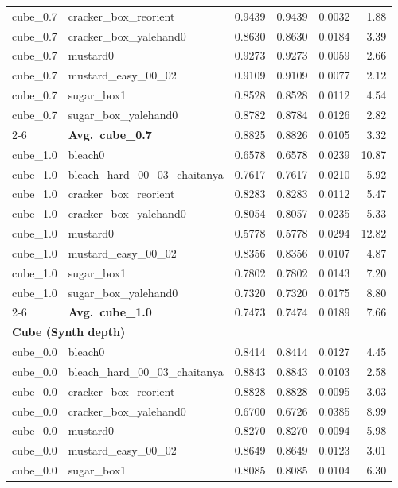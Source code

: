 \begin{longtable}{llrrrr}
  cube_0.7 & cracker\_box\_reorient & 0.9439 & 0.9439 & 0.0032 & 1.88 \\
  cube_0.7 & cracker\_box\_yalehand0 & 0.8630 & 0.8630 & 0.0184 & 3.39 \\
  cube_0.7 & mustard0 & 0.9273 & 0.9273 & 0.0059 & 2.66 \\
  cube_0.7 & mustard\_easy\_00\_02 & 0.9109 & 0.9109 & 0.0077 & 2.12 \\
  cube_0.7 & sugar\_box1 & 0.8528 & 0.8528 & 0.0112 & 4.54 \\
  cube_0.7 & sugar\_box\_yalehand0 & 0.8782 & 0.8784 & 0.0126 & 2.82 \\
  \cmidrule{2-6}
  & \textbf{Avg.~cube_0.7} & 0.8825 & 0.8826 & 0.0105 & 3.32 \\
  \midrule
  cube_1.0 & bleach0 & 0.6578 & 0.6578 & 0.0239 & 10.87 \\
  cube_1.0 & bleach\_hard\_00\_03\_chaitanya & 0.7617 & 0.7617 & 0.0210 & 5.92 \\
  cube_1.0 & cracker\_box\_reorient & 0.8283 & 0.8283 & 0.0112 & 5.47 \\
  cube_1.0 & cracker\_box\_yalehand0 & 0.8054 & 0.8057 & 0.0235 & 5.33 \\
  cube_1.0 & mustard0 & 0.5778 & 0.5778 & 0.0294 & 12.82 \\
  cube_1.0 & mustard\_easy\_00\_02 & 0.8356 & 0.8356 & 0.0107 & 4.87 \\
  cube_1.0 & sugar\_box1 & 0.7802 & 0.7802 & 0.0143 & 7.20 \\
  cube_1.0 & sugar\_box\_yalehand0 & 0.7320 & 0.7320 & 0.0175 & 8.80 \\
  \cmidrule{2-6}
  & \textbf{Avg.~cube_1.0} & 0.7473 & 0.7474 & 0.0189 & 7.66 \\
  \midrule
\multicolumn{6}{l}{\textbf{Cube (Synth depth)}} \\
\midrule
  cube_0.0 & bleach0 & 0.8414 & 0.8414 & 0.0127 & 4.45 \\
  cube_0.0 & bleach\_hard\_00\_03\_chaitanya & 0.8843 & 0.8843 & 0.0103 & 2.58 \\
  cube_0.0 & cracker\_box\_reorient & 0.8828 & 0.8828 & 0.0095 & 3.03 \\
  cube_0.0 & cracker\_box\_yalehand0 & 0.6700 & 0.6726 & 0.0385 & 8.99 \\
  cube_0.0 & mustard0 & 0.8270 & 0.8270 & 0.0094 & 5.98 \\
  cube_0.0 & mustard\_easy\_00\_02 & 0.8649 & 0.8649 & 0.0123 & 3.01 \\
  cube_0.0 & sugar\_box1 & 0.8085 & 0.8085 & 0.0104 & 6.30 \\

\end{longtable}
